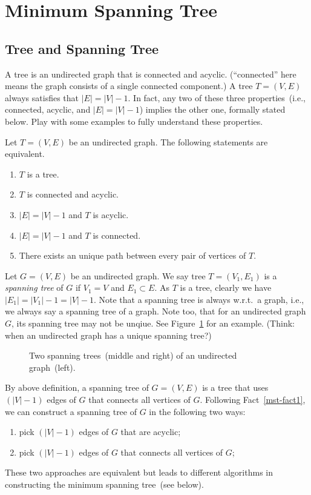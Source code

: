 \section{Minimum Spanning Tree}

\subsection*{Tree and Spanning Tree}

A tree is an undirected graph that is connected and acyclic.
(``connected'' here means the graph consists of a single connected component.)
A tree $T = (V, E)$ always satisfies that $|E| = |V| - 1$.
In fact, any two of these three properties~(i.e., connected, acyclic, and $|E| = |V| - 1$)
implies the other one, formally stated below. Play with some examples
to fully understand these properties.

\begin{fact}\label{mst-fact1}
Let $T = (V, E)$ be an undirected graph. The following statements are equivalent.
\begin{enumerate}
\item $T$ is a tree.
\item $T$ is connected and acyclic.
\item $|E| = |V| - 1$ and $T$ is acyclic.
\item $|E| = |V| - 1$ and $T$ is connected.
\item There exists an unique path between every pair of vertices of $T$.
\end{enumerate}
\end{fact}

Let $G = (V,E)$ be an undirected graph.
We say tree $T = (V_1, E_1)$ is a \emph{spanning tree}
of $G$ if $V_1 = V$ and $E_1\subset E$.
As $T$ is a tree, clearly we have $|E_1| = |V_1| - 1 = |V| - 1$.
Note that a spanning tree is always w.r.t.\ a graph, i.e., we always
say a spanning tree of a graph. Note too, that for an undirected graph $G$, 
its spanning tree may not be unqiue. See Figure~\ref{fig:mst-spanning}
for an example.  (Think: when an undirected graph has a unique spanning tree?)

\begin{figure}[h]
\centering{}
\caption{Two spanning trees~(middle and right) of an undirected graph~(left).}
\label{fig:mst-spanning}
\end{figure}

By above definition, a spanning tree of $G = (V,E)$ is a tree that uses $(|V| - 1)$ edges
of $G$ that connects all vertices of $G$.
Following Fact~\ref{mst-fact1}, we can construct a spanning tree of $G$
in the following two ways:
\begin{enumerate}
\item pick $(|V|-1)$ edges of $G$ that are acyclic;
\item pick $(|V|-1)$ edges of $G$ that connects all vertices of $G$;
\end{enumerate}
These two approaches are equivalent but leads to different algorithms
in constructing the minimum spanning tree~(see below).


